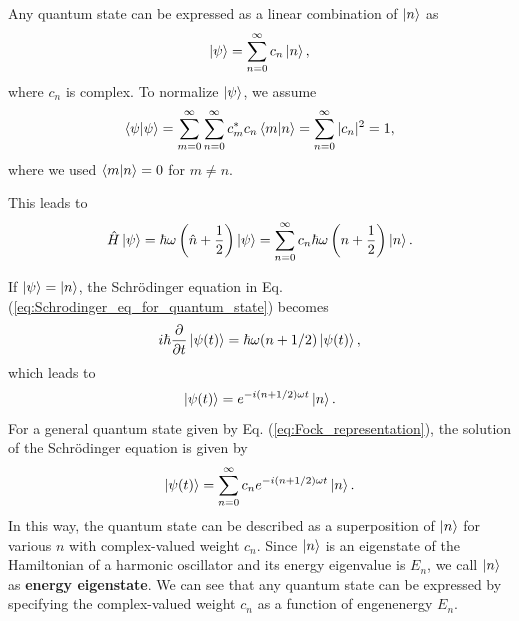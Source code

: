 Any quantum state can be expressed as a linear combination of $\ket n$ as
\begin{equation}
  \ket \psi = \sum_{n=0}^{\infty}c_n\ket n,
  \label{eq:Fock_representation}
\end{equation}
where $c_n$ is complex. To normalize $\ket \psi$, we assume
\begin{equation}
  \braket{\psi|\psi} = \sum_{m=0}^{\infty}\sum_{n=0}^{\infty}c_m^*c_n\braket{m|n}=\sum_{n = 0}^{\infty}|c_n|^2 = 1,
\end{equation}
where we used $\braket{m|n} = 0$ for $m\neq n$. 

This leads to
\begin{equation}
  \hat H \ket \psi = \hbar \omega \left(\hat n + \frac 1 2 \right)\ket \psi = \sum_{n=0}^{\infty} c_n \hbar \omega \left(n + \frac{1}{2}\right)\ket n.
\end{equation}

If $\ket \psi = \ket n$, the Schr\"odinger equation in Eq. (\ref{eq:Schrodinger_eq_for_quantum_state}) becomes 
\begin{equation}
  i\hbar \frac{\partial}{\partial t}\ket{\psi(t)}= \hbar \omega (n + 1/2)\ket {\psi(t)},
\end{equation}
which leads to
\begin{equation}
  \ket{\psi(t)} = e^{-i(n + 1/2)\omega t}\ket n.
\end{equation}
For a general quantum state given by Eq. (\ref{eq:Fock_representation}), the solution of the Schr\"odinger equation is given by
\begin{equation}
  \ket{\psi(t)} = \sum_{n=0}^{\infty}c_n e^{-i(n+1/2)\omega t}\ket n.
  \label{eq:Schrodinger_eq_solution}
\end{equation}
In this way, the quantum state can be described as a superposition of $\ket n$ for various $n$ with complex-valued weight $c_n$. Since $\ket n$ is an eigenstate of the Hamiltonian of a harmonic oscillator and its energy eigenvalue is $E_n$, we call $\ket n$ as \textbf{energy eigenstate}. We can see that any quantum state can be expressed by specifying the complex-valued weight $c_n$ as a function of engenenergy $E_n$. 

